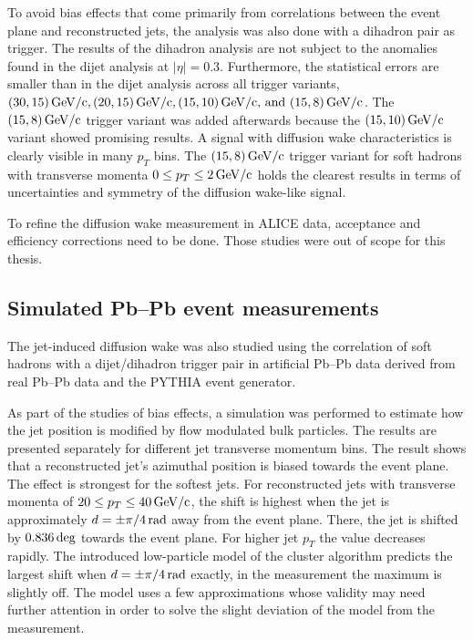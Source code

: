 \documentclass[
  a4paper,
  12pt,
  oneside,
  parskip=half,
  listof=totoc,
  bibliography=totoc,
  DIV=12,
  numbers=noenddot,
  BA.tex
  ]{subfiles}
\begin{document}
To avoid bias effects that come primarily from correlations between the event plane and reconstructed jets, the analysis was also done with a dihadron pair as trigger. The results of the dihadron analysis are not subject to the anomalies found in the dijet analysis at $|\eta| = 0.3$. Furthermore, the statistical errors are smaller than in the dijet analysis across all trigger variants, $(30,15)\bunit{GeV/c}, (20,15)\bunit{GeV/c}, (15,10)\bunit{GeV/c} \text{, and } (15,8)\bunit{GeV/c}$. The $(15,8)\bunit{GeV/c}$ trigger variant was added afterwards because the $(15,10)\bunit{GeV/c}$ variant showed promising results. A signal with diffusion wake characteristics is clearly visible in many $p_T$ bins. The $(15,8)\bunit{GeV/c}$ trigger variant for soft hadrons with transverse momenta $0 \leq p_T \leq 2 \bunit{GeV/c}$ holds the clearest results in terms of uncertainties and symmetry of the diffusion wake-like signal.

To refine the diffusion wake measurement in ALICE data, acceptance and efficiency corrections need to be done. Those studies were out of scope for this thesis.

\subsection{Simulated Pb--Pb event measurements}

The jet-induced diffusion wake was also studied using the correlation of soft hadrons with a dijet/dihadron trigger pair in artificial Pb--Pb data derived from real Pb--Pb data and the PYTHIA event generator.

As part of the studies of bias effects, a simulation was performed to estimate how the jet position is modified by flow modulated bulk particles. The results are presented separately for different jet transverse momentum bins. The result shows that a reconstructed jet's azimuthal position is biased towards the event plane. The effect is strongest for the softest jets. For reconstructed jets with transverse momenta of $20 \leq p_T \leq 40 \bunit{GeV/c}$, the shift is highest when the jet is approximately $d = \pm \pi/4 \bunit{rad}$ away from the event plane. There, the jet is shifted by $0.836 \bunit{deg}$ towards the event plane. For higher jet $p_T$ the value decreases rapidly. The introduced low-particle model of the cluster algorithm predicts the largest shift when $d = \pm \pi/4 \bunit{rad}$ exactly, in the measurement the maximum is slightly off. The model uses a few approximations whose validity may need further attention in order to solve the slight deviation of the model from the measurement.
\end{document}
